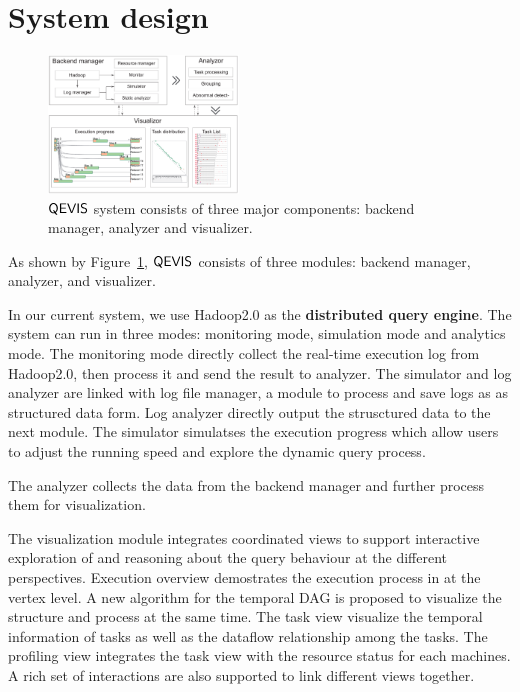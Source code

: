 \section{System design}
\begin{figure}[t]
	\centering
	\includegraphics[width=0.45\textwidth]{figures/system/sysdesign.pdf}
	\vspace{-3mm}
	\caption{$\mathsf{QEVIS}$ system consists of three major components: backend manager, analyzer and visualizer.}
	\label{fig:sysdesign}
	\vspace{-3mm}
\end{figure}
As shown by Figure~\ref{fig:sysdesign}, $\mathsf{QEVIS}$ consists of three modules: backend manager, analyzer, and visualizer. 

In our current system, we use Hadoop2.0 as the\textbf{ distributed query engine}. The system can run in three modes: monitoring mode, simulation mode and analytics mode. The monitoring mode directly collect the real-time execution log from Hadoop2.0, then process it and send the result to analyzer. The simulator and log analyzer are linked with log file manager, a module to process and save logs as as structured data form. Log analyzer directly output the strusctured data to the next module. The simulator simulatses the execution progress which allow users to adjust the running speed and explore the dynamic query process. 

The analyzer collects the data from the backend manager and further process them for visualization. 

The visualization module integrates coordinated views to support interactive exploration of and reasoning about the query behaviour at the different perspectives. Execution overview demostrates the execution process in at the vertex level. A new algorithm for the temporal DAG is proposed to visualize the structure and process at the same time. The task view visualize the temporal information of tasks as well as the dataflow relationship among the tasks. The profiling view integrates the task view with the resource status for each machines.  A rich set of interactions are also supported to link different views together.


